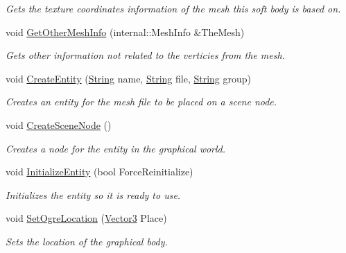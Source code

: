 \begin{DoxyCompactItemize}
\begin{DoxyCompactList}\small\item\em Gets the texture coordinates information of the mesh this soft body is based on. \item\end{DoxyCompactList}\item 
void \hyperlink{classphys_1_1ActorBase_a1ca4a67351c3d7375a62223d12729776}{GetOtherMeshInfo} (internal::MeshInfo \&TheMesh)
\begin{DoxyCompactList}\small\item\em Gets other information not related to the verticies from the mesh. \item\end{DoxyCompactList}\item 
void \hyperlink{classphys_1_1ActorBase_aff7dbb190fb982a43123bee3066501c4}{CreateEntity} (\hyperlink{namespacephys_aa03900411993de7fbfec4789bc1d392e}{String} name, \hyperlink{namespacephys_aa03900411993de7fbfec4789bc1d392e}{String} file, \hyperlink{namespacephys_aa03900411993de7fbfec4789bc1d392e}{String} group)
\begin{DoxyCompactList}\small\item\em Creates an entity for the mesh file to be placed on a scene node. \item\end{DoxyCompactList}\item 
void \hyperlink{classphys_1_1ActorBase_a125d6f0a0b4072e64490638c074eea2d}{CreateSceneNode} ()
\begin{DoxyCompactList}\small\item\em Creates a node for the entity in the graphical world. \item\end{DoxyCompactList}\item 
void \hyperlink{classphys_1_1ActorBase_aa1c797df444a498970249e9b41dc7d7e}{InitializeEntity} (bool ForceReinitialize)
\begin{DoxyCompactList}\small\item\em Initializes the entity so it is ready to use. \item\end{DoxyCompactList}\item 
void \hyperlink{classphys_1_1ActorBase_a192ced7c3191f3f9d4921aad73952046}{SetOgreLocation} (\hyperlink{classphys_1_1Vector3}{Vector3} Place)
\begin{DoxyCompactList}\small\item\em Sets the location of the graphical body. \item\end{DoxyCompactList}\item 

\end{DoxyCompactItemize}
